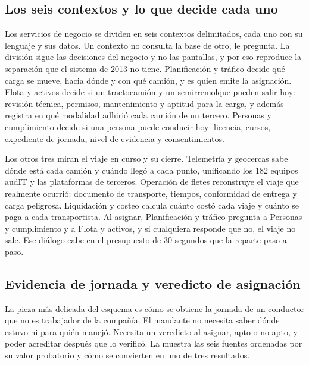 \subsection{Los seis contextos y lo que decide cada uno}\label{sec:3-contextos}

Los servicios de negocio se dividen en seis contextos delimitados, cada uno con su lenguaje y sus datos.
Un contexto no consulta la base de otro, le pregunta. La división sigue las decisiones del negocio y no
las pantallas, y por eso reproduce la separación que el sistema de 2013 no tiene. Planificación y
tráfico decide qué carga se mueve, hacia dónde y con qué camión, y es quien emite la asignación.
Flota y activos decide si un tractocamión y un semirremolque pueden salir hoy: revisión técnica,
permisos, mantenimiento y aptitud para la carga, y además registra en qué modalidad adhirió cada camión
de un tercero. Personas y cumplimiento decide si una persona puede conducir hoy: licencia, cursos,
expediente de jornada, nivel de evidencia y consentimientos.

Los otros tres miran el viaje en curso y su cierre. Telemetría y geocercas sabe dónde está cada camión y
cuándo llegó a cada punto, unificando los 182 equipos audIT y las plataformas de terceros. Operación de
fletes reconstruye el viaje que realmente ocurrió: documento de transporte, tiempos, conformidad de
entrega y carga peligrosa. Liquidación y costeo calcula cuánto costó cada viaje y cuánto se paga a cada
transportista. Al asignar, Planificación y tráfico pregunta a Personas y cumplimiento y a Flota y activos,
y si cualquiera responde que no, el viaje no sale. Ese diálogo cabe en el presupuesto de 30 segundos que
la  reparte paso a paso.

\subsection{Evidencia de jornada y veredicto de asignación}\label{sec:3-evidencia}

La pieza más delicada del esquema es cómo se obtiene la jornada de un conductor que no es trabajador de
la compañía. El mandante no necesita saber dónde estuvo ni para quién manejó. Necesita un veredicto al
asignar, apto o no apto, y poder acreditar después que lo verificó. La  muestra las
seis fuentes ordenadas por su valor probatorio y cómo se convierten en uno de tres resultados.

